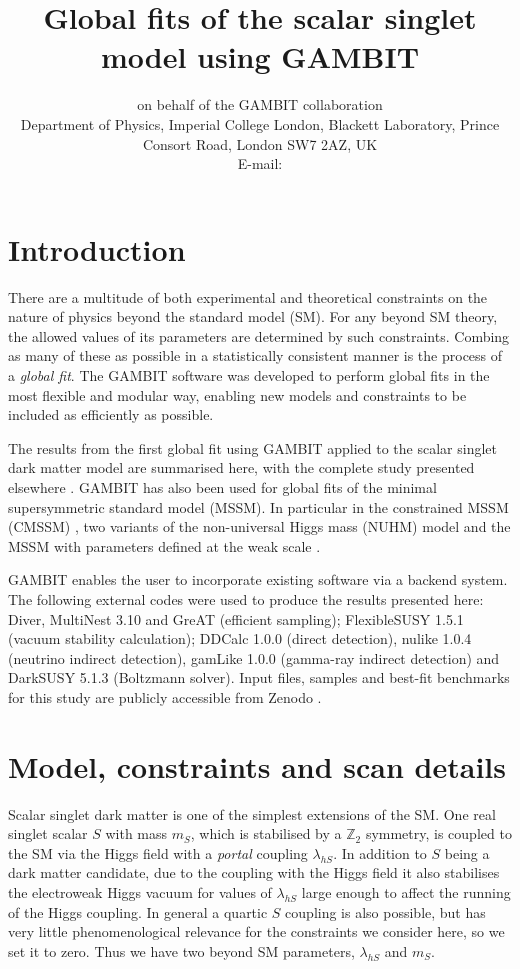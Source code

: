 \documentclass{PoS}
\title{Global fits of the scalar singlet model using GAMBIT}
\author{\speaker{James McKay} {\rm on behalf of the GAMBIT collaboration}\\
 Department of Physics, Imperial College London, Blackett Laboratory, Prince Consort Road, London SW7 2AZ, UK\\
        E-mail: \email{j.mckay14@imperial.ac.uk}}
\newcommand{\GB}{\textsf{GAMBIT}\xspace}
\newcommand{\Diver}{\textsf{Diver}\xspace}
\newcommand{\MultiNest}{\textsf{MultiNest}\xspace}
\newcommand{\flexiblesusy}{\textsf{FlexibleSUSY}\xspace}
\newcommand{\DarkSUSY}{\textsf{DarkSUSY}\xspace}
\newcommand{\DDCalc}{\textsf{DDCalc}\xspace}
\newcommand{\nuLike}{\textsf{nulike}\xspace}
\newcommand\great{\textsf{GreAT}\xspace}
\newcommand{\sss}{\scriptscriptstyle}
\newcommand{\ms}{m_{\sss S}}
\newcommand{\lhs}{\lambda_{h\sss S}}
\begin{document}
\section{Introduction}

There are a multitude of both experimental and theoretical constraints on the nature of physics beyond the standard model (SM).  For any beyond SM theory, the allowed values of its parameters are determined by such constraints.  Combing as many of these as possible in a statistically consistent manner is the process of a \textit{global fit}.  The \GB software \cite{Athron:2017ard,Workgroup:2017htr,Workgroup:2017bkh,Workgroup:2017lvb,Balazs:2017moi,Workgroup:2017myk} was developed to perform global fits in the most flexible and modular way, enabling new models and constraints to be included as efficiently as possible.

The results from the first global fit using \GB applied to the scalar singlet dark matter model are summarised here, with the complete study presented elsewhere \cite{Athron:2017kgt}.  \GB has also been used for global fits of the minimal supersymmetric standard model (MSSM).  In particular in the constrained MSSM (CMSSM) \cite{Athron:2017qdc}, two variants of the non-universal Higgs mass (NUHM) model \cite{Athron:2017qdc} and the MSSM with parameters defined at the weak scale \cite{Athron:2017yua}.

\GB enables the user to incorporate existing software via a backend system.  The following external codes were used to produce the results presented here:  \Diver \cite{Workgroup:2017htr}, \MultiNest 3.10 \cite{Feroz:2008xx} and \great \cite{great} (efficient sampling); \flexiblesusy 1.5.1 \cite{Athron:2014yba} (vacuum stability calculation);  \DDCalc 1.0.0 \cite{Workgroup:2017lvb} (direct detection), \nuLike 1.0.4 \cite{Scott:2012mq,IC79_SUSY} (neutrino indirect detection), gamLike 1.0.0 \cite{Workgroup:2017lvb} (gamma-ray indirect detection) and \DarkSUSY 5.1.3 \cite{Gondolo:2004sc} (Boltzmann solver).  Input files, samples and best-fit benchmarks for this study are publicly accessible from \textsf{Zenodo} \cite{the_gambit_collaboration_2017_801511}.

\section{Model, constraints and scan details}

Scalar singlet dark matter is one of the simplest extensions of the SM.  One real singlet scalar $S$ with mass $\ms$, which is stabilised by a $\mathbb{Z}_2$ symmetry, is coupled to the SM via the Higgs field with a \textit{portal} coupling $\lhs$.  In addition to $S$ being a dark matter candidate, due to the coupling with the Higgs field it also stabilises the electroweak Higgs vacuum for values of $\lhs$ large enough to affect the running of the Higgs coupling.  In general a quartic $S$ coupling is also possible, but has very little phenomenological relevance for the constraints we consider here, so we set it to zero. Thus we have two beyond SM parameters, $\lhs$ and $\ms$.
\end{document}
